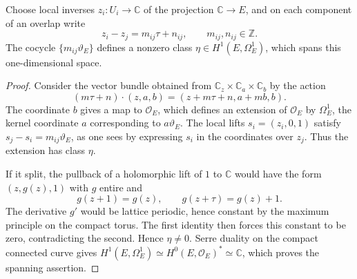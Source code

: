 \begin{lemma}\label{lem:elliptic-additive-class}
Choose local inverses $z_i\colon U_i\to\mathbb C$ of the projection $\mathbb C\to E$, and on each component of an overlap write
\[
 z_i-z_j=m_{ij}\tau+n_{ij},\qquad m_{ij},n_{ij}\in\mathbb Z.
\]
The cocycle $\{m_{ij}\vartheta_E\}$ defines a nonzero class $\eta\in H^1(E,\Omega_E^1)$, which spans this one-dimensional space.
\end{lemma}
\begin{proof}
Consider the vector bundle obtained from $\mathbb C_z\times\mathbb C_a\times\mathbb C_b$ by the action
\[
 (m\tau+n)\cdot(z,a,b)=(z+m\tau+n,a+mb,b).
\]
The coordinate $b$ gives a map to $\mathcal O_E$, which defines an extension of $\mathcal O_E$ by $\Omega_E^1$, the kernel coordinate $a$ corresponding to $a\vartheta_E$. The local lifts $s_i=(z_i,0,1)$ satisfy $s_j-s_i=m_{ij}\vartheta_E$, as one sees by expressing $s_i$ in the coordinates over $z_j$. Thus the extension has class $\eta$.

If it split, the pullback of a holomorphic lift of $1$ to $\mathbb C$ would have the form $(z,g(z),1)$ with $g$ entire and
\[
 g(z+1)=g(z),\qquad g(z+\tau)=g(z)+1.
\]
The derivative $g'$ would be lattice periodic, hence constant by the maximum principle on the compact torus. The first identity then forces this constant to be zero, contradicting the second. Hence $\eta\ne0$. Serre duality on the compact connected curve gives $H^1(E,\Omega_E^1)\simeq H^0(E,\mathcal O_E)^*\simeq\mathbb C$, which proves the spanning assertion.
\end{proof}

